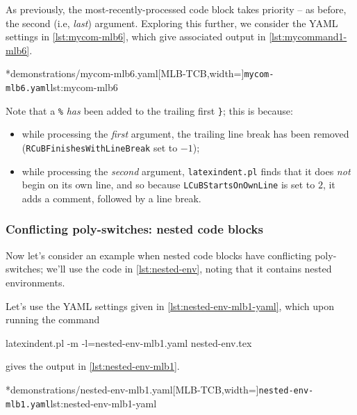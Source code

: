 	As previously, the most-recently-processed code block takes priority -- as before, the
	second (i.e, \emph{last}) argument. Exploring this further, we consider the YAML settings
	in \cref{lst:mycom-mlb6}, which give associated output in \cref{lst:mycommand1-mlb6}.

	\begin{cmhtcbraster}[raster column skip=.1\linewidth]
		\cmhlistingsfromfile[style=yaml-LST]*{demonstrations/mycom-mlb6.yaml}[MLB-TCB,width=\linewidth]{\texttt{mycom-mlb6.yaml}}{lst:mycom-mlb6}
	\end{cmhtcbraster}

	Note that a \lstinline!%! \emph{has} been added to the trailing first
	\lstinline!}!; this is because:
	\begin{itemize}
		\item while processing the \emph{first} argument, the trailing line break has been removed
		      (\texttt{RCuBFinishesWithLineBreak} set to $-1$);
		\item while processing the \emph{second} argument, \texttt{latexindent.pl} finds that it does
		      \emph{not} begin on its own line, and so because \texttt{LCuBStartsOnOwnLine} is set to
		      $2$, it adds a comment, followed by a line break.
	\end{itemize}

\subsubsection{Conflicting poly-switches: nested code blocks}
	Now let's consider an example when nested code blocks have conflicting poly-switches;
	we'll use the code in \cref{lst:nested-env}, noting that it contains nested environments.


	Let's use the YAML settings given in \cref{lst:nested-env-mlb1-yaml}, which upon running
	the command
	\begin{commandshell}
latexindent.pl -m -l=nested-env-mlb1.yaml nested-env.tex
\end{commandshell}
	gives the output in \cref{lst:nested-env-mlb1}.

	\begin{cmhtcbraster}[raster column skip=.05\linewidth]
		\cmhlistingsfromfile[style=yaml-LST]*{demonstrations/nested-env-mlb1.yaml}[MLB-TCB,width=\linewidth]{\texttt{nested-env-mlb1.yaml}}{lst:nested-env-mlb1-yaml}
	\end{cmhtcbraster}

